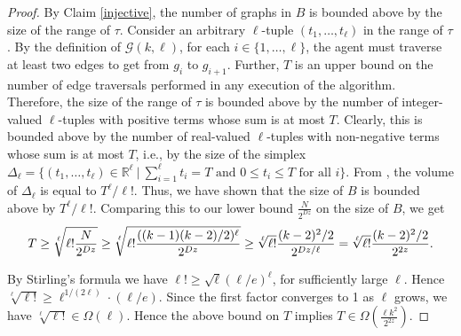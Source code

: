 \documentclass{llncs}
\newcommand{\classletter}{\ensuremath{\mathcal{G}}}
\newcommand{\ourclass}{\ensuremath{\classletter (k,\ell)}}
\begin{document}
\begin{proof}
By Claim \ref{injective}, the number of graphs in $B$ is bounded above by the size of the range of $\tau$. Consider an arbitrary $\ell$-tuple $(t_1,\ldots,t_\ell)$ in the range of $\tau$. By the definition of $\ourclass$, for each $i \in \{1,\ldots,\ell\}$, the agent must traverse at least two edges to get from $g_i$ to $g_{i+1}$. Further, $T$ is an upper bound on the number of edge traversals performed in any execution of the algorithm. Therefore, the size of the range of $\tau$ is bounded above by the number of integer-valued $\ell$-tuples with positive terms whose sum is at most $T$.  Clearly, this is bounded above by the number of real-valued $\ell$-tuples with non-negative terms whose sum is at most $T$, i.e., by the size of the simplex $\Delta_\ell = \{ (t_1,\ldots,t_\ell) \in \mathbb{R}^{\ell}\ |\ \sum\limits_{i=1}^{\ell} t_i = T \textrm{ and } 0 \leq t_i \leq T \textrm{ for all $i$} \}$. From \cite{ellis}, the volume of $\Delta_\ell$ is equal to $T^\ell/\ell !$. Thus, we have shown that the  size of $B$ is bounded above by $T^\ell/\ell !$. Comparing this to our lower bound $\frac{N}{2^{Dz}}$ on the size of $B$, we get
\[
T  \geq   \sqrt[\ell]{\ell ! \frac{N}{2^{Dz}}} 
  \geq   \sqrt[\ell]{\ell ! \frac{((k-1)(k-2)/2)^{\ell}}{2^{Dz}}} 
   \geq   \sqrt[\ell]{\ell !} \frac{(k-2)^{2}/2}{2^{Dz/\ell}}\\
  =  \sqrt[\ell]{\ell !} \frac{(k-2)^{2}/2}{2^{2z}}.
\]

By Stirling's formula we have $\ell ! \geq \sqrt{\ell}(\ell/e)^{\ell}$, for sufficiently large $\ell$. Hence $\sqrt[\ell]{\ell !}\geq  \ell^{1/(2\ell)} \cdot (\ell/e)$.
Since the first factor converges to 1 as $\ell$ grows, we have $\sqrt[\ell]{\ell !} \in \Omega(\ell)$. Hence the above bound on $T$ implies $T \in \Omega(\frac{\ell k^{2}}{2^{2z}})$.
\end{proof}
\end{document}
